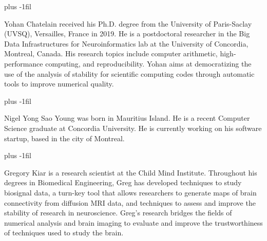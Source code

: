 \documentclass[10pt,journal,compsoc]{IEEEtran}
\begin{document}
\baselineskip plus -1fil
\begin{IEEEbiography}{Yohan
        Chatelain} received his Ph.D. degree from the University of Paris-Saclay
    (UVSQ), Versailles, France in 2019. He is a postdoctoral researcher in the
    Big Data Infrastructures for Neuroinformatics lab at the University of
    Concordia, Montreal, Canada. His research topics include computer
    arithmetic, high-performance computing, and reproducibility. Yohan aims at
    democratizing the use of the analysis of stability for scientific computing
    codes through automatic tools to improve numerical quality. 
\end{IEEEbiography}

\baselineskip plus -1fil
\begin{IEEEbiography}{Nigel
        Yong Sao Young} was born in Mauritius Island. He is a recent Computer
    Science graduate at Concordia University. He is currently working on his
    software startup, based in the city of Montreal.
\end{IEEEbiography}

\baselineskip plus -1fil
\begin{IEEEbiography}{Gregory
        Kiar} is a research scientist at the Child Mind Institute. Throughout his
    degrees in Biomedical Engineering, Greg has developed techniques to study
    biosignal data, a turn-key tool that allows researchers to generate maps of
    brain connectivity from diffusion MRI data, and techniques to assess and
    improve the stability of research in neuroscience. Greg’s research bridges
    the fields of numerical analysis and brain imaging to evaluate and improve
    the trustworthiness of techniques used to study the brain. 
\end{IEEEbiography}
\end{document}
